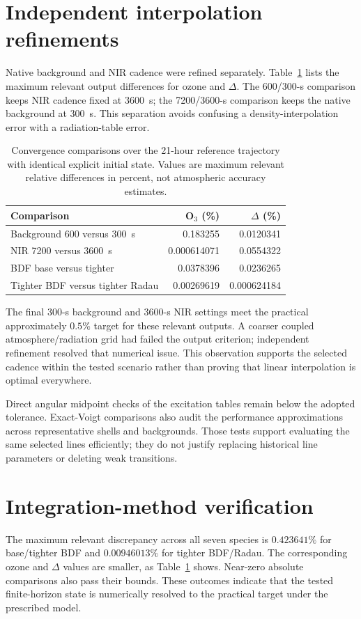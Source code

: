 \section{Independent interpolation refinements}
Native background and NIR cadence were refined separately. Table~\ref{tab:convergence} lists the maximum relevant output differences for ozone and $\Delta$. The 600/300-s comparison keeps NIR cadence fixed at 3600~s; the 7200/3600-s comparison keeps the native background at 300~s. This separation avoids confusing a density-interpolation error with a radiation-table error.

\begin{table}[htbp]\centering\small
\caption{Convergence comparisons over the 21-hour reference trajectory with identical explicit initial state. Values are maximum relevant relative differences in percent, not atmospheric accuracy estimates.}\label{tab:convergence}
\begin{tabular}{lrr}\toprule Comparison & O$_3$ (\%) & $\Delta$ (\%)\\\midrule
Background 600 versus 300~s & 0.183255 & 0.0120341\\
NIR 7200 versus 3600~s & 0.000614071 & 0.0554322\\
BDF base versus tighter & 0.0378396 & 0.0236265\\
Tighter BDF versus tighter Radau & 0.00269619 & 0.000624184\\\bottomrule
\end{tabular}\end{table}

The final 300-s background and 3600-s NIR settings meet the practical approximately $0.5\%$ target for these relevant outputs. A coarser coupled atmosphere/radiation grid had failed the output criterion; independent refinement resolved that numerical issue. This observation supports the selected cadence within the tested scenario rather than proving that linear interpolation is optimal everywhere.

Direct angular midpoint checks of the excitation tables remain below the adopted tolerance. Exact-Voigt comparisons also audit the performance approximations across representative shells and backgrounds. Those tests support evaluating the same selected lines efficiently; they do not justify replacing historical line parameters or deleting weak transitions.

\section{Integration-method verification}
The maximum relevant discrepancy across all seven species is $0.423641\%$ for base/tighter BDF and $0.00946013\%$ for tighter BDF/Radau. The corresponding ozone and $\Delta$ values are smaller, as Table~\ref{tab:convergence} shows. Near-zero absolute comparisons also pass their bounds. These outcomes indicate that the tested finite-horizon state is numerically resolved to the practical target under the prescribed model.

